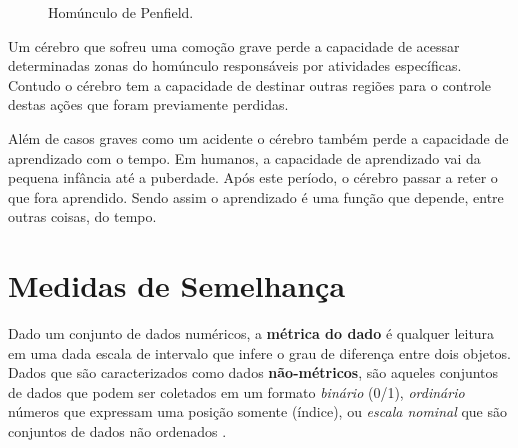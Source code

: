 \begin{figure}[H]
	\centering
	\setlength{\fboxsep}{8pt}
	\setlength{\fboxrule}{0.1pt}
	\caption{Homúnculo de Penfield.}
	\label{homunculo}
\end{figure}

Um cérebro que sofreu uma comoção grave perde a capacidade de acessar determinadas zonas do homúnculo responsáveis por atividades específicas. Contudo o cérebro tem a capacidade de destinar outras regiões para o controle destas ações que foram previamente perdidas.

Além de casos graves como um acidente o cérebro também perde a capacidade de aprendizado com o tempo. Em humanos, a capacidade de aprendizado vai da pequena infância até a puberdade. Após este período, o cérebro passar a reter o que fora aprendido. Sendo assim o aprendizado é uma função que depende, entre outras coisas, do tempo.

\section{Medidas de Semelhança}

Dado um conjunto de dados numéricos, a \textbf{métrica do dado} é qualquer leitura em uma dada escala de intervalo que infere o grau de diferença entre dois objetos.  Dados que são caracterizados como dados \textbf{não-métricos}, são aqueles conjuntos de dados que podem ser coletados em um formato \textit{binário} (0/1),  \textit{ordinário} números que expressam uma posição somente (índice), ou \textit{escala nominal} que são conjuntos de dados não ordenados \citep{Michel2016}.

